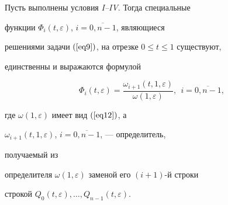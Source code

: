 \begin{lem}


Пусть выполнены условия {\em I--IV}. Тогда специальные 


функции $\Phi _{i}(t,\varepsilon)$, $i=\overline{0,n-1}$, являющиеся 


решениями задачи $(\ref{eq9})$, на отрезке $0 \le t \le 1$ существуют, 


единственны и выражаются формулой


\begin{equation}


\label{eq14}


\Phi _{i} (t,\varepsilon ) = {\frac{{\omega _{i + 1} (t,1,\varepsilon 


)}}{{\omega (1,\varepsilon )}}},\ \ i = \overline {0,n - 1} ,


\end{equation}


где $\omega (1,\varepsilon )$ имеет вид $(\ref{eq12})$, а 


$\omega _{i + 1}(t,1,\varepsilon )$, $i=\overline{0,n-1}$, --- определитель, 


получаемый из 


определителя $\omega (1,\varepsilon )$ заменой его $(i + 1)$-й строки 


строкой $Q_{0} (t,\varepsilon ),\dotsc,Q_{n - 1} (t,\varepsilon )$.


\end{lem}





